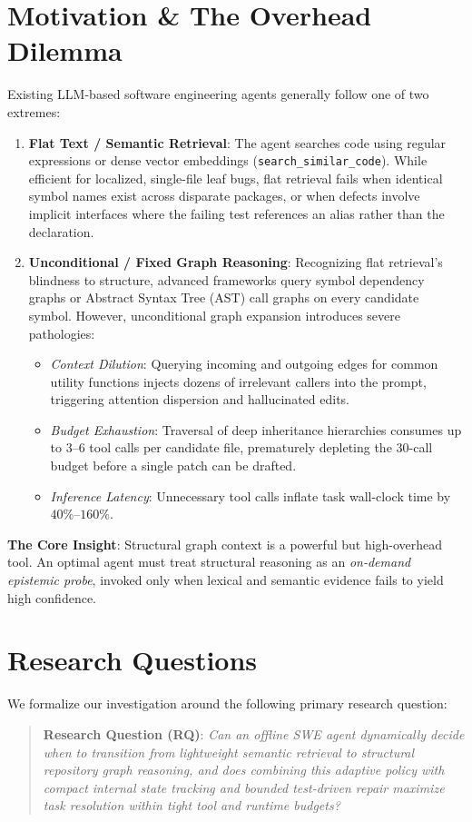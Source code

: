 \documentclass[10pt,twocolumn,letterpaper]{article}
\begin{document}
\section{Motivation \& The Overhead Dilemma}
Existing LLM-based software engineering agents \cite{yao2023react, yang2024sweagent} generally follow one of two extremes:
\begin{enumerate}
    \item \textbf{Flat Text / Semantic Retrieval}: The agent searches code using regular expressions or dense vector embeddings (\texttt{search\_similar\_code}). While efficient for localized, single-file leaf bugs, flat retrieval fails when identical symbol names exist across disparate packages, or when defects involve implicit interfaces where the failing test references an alias rather than the declaration.
    \item \textbf{Unconditional / Fixed Graph Reasoning}: Recognizing flat retrieval's blindness to structure, advanced frameworks query symbol dependency graphs or Abstract Syntax Tree (AST) call graphs on every candidate symbol. However, unconditional graph expansion introduces severe pathologies:
    \begin{itemize}
        \item \emph{Context Dilution}: Querying incoming and outgoing edges for common utility functions injects dozens of irrelevant callers into the prompt, triggering attention dispersion and hallucinated edits.
        \item \emph{Budget Exhaustion}: Traversal of deep inheritance hierarchies consumes up to $3\text{--}6$ tool calls per candidate file, prematurely depleting the 30-call budget before a single patch can be drafted.
        \item \emph{Inference Latency}: Unnecessary tool calls inflate task wall-clock time by $40\%\text{--}160\%$.
    \end{itemize}
\end{enumerate}

\noindent\textbf{The Core Insight}: Structural graph context is a powerful but high-overhead tool. An optimal agent must treat structural reasoning as an \emph{on-demand epistemic probe}, invoked only when lexical and semantic evidence fails to yield high confidence.

\section{Research Questions}
We formalize our investigation around the following primary research question:
\begin{quote}
\textbf{Research Question (RQ)}: \emph{Can an offline SWE agent dynamically decide when to transition from lightweight semantic retrieval to structural repository graph reasoning, and does combining this adaptive policy with compact internal state tracking and bounded test-driven repair maximize task resolution within tight tool and runtime budgets?}
\end{quote}
\end{document}
